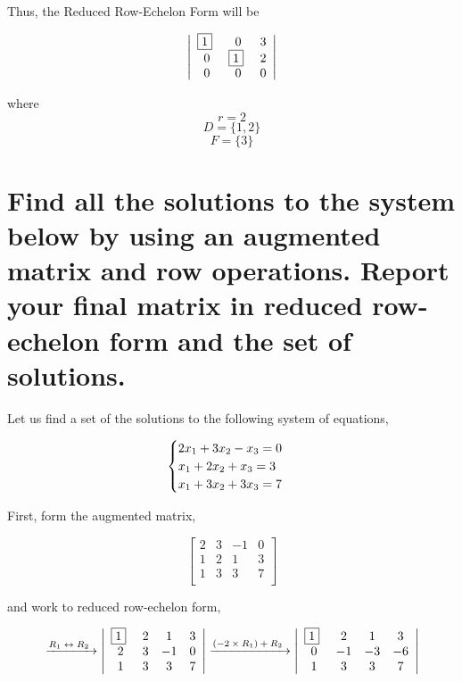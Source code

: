 \documentclass{article}
\begin{document}
\bigskip

Thus, the Reduced Row-Echelon Form will be

\[\left| \begin{array}{ccc}
$\boxed{1}$~ & 0 & 3  \\
0 & $\boxed{1}$~ & 2 \\
0 & 0 & 0
\end{array} \right|\]

where
\[r=2\]
\[D=\{1,2\}\]
\[F=\{3\}\]




\section{Find all the solutions to the system below by using an augmented matrix and row operations. Report your final matrix in reduced row-echelon form and the set of solutions.}

Let us find a set of the solutions to the following system of equations,

\[
\begin{cases}
2x\textsubscript{1} + 3x\textsubscript{2} - x\textsubscript{3} = 0 \\
x\textsubscript{1} + 2x\textsubscript{2} + x\textsubscript{3} = 3 \\
x\textsubscript{1} + 3x\textsubscript{2} + 3x\textsubscript{3} = 7
\end{cases}
\]

\bigskip

First, form the augmented matrix,

\[
\left[
\begin{array}{cccc}
2 & 3 & -1 & 0 \\
1 & 2 & 1 & 3 \\
1 & 3 & 3 & 7 \\
\end{array}
\right]
\]

\bigskip

and work to reduced row-echelon form,

\[
\xrightarrow[]{\text{$ R\textsubscript{1} \leftrightarrow R\textsubscript{2} $~}}
\left| \begin{array}{cccc}
$\boxed{1}$~ & 2 & 1 & 3 \\
2 & 3 & -1 & 0 \\
1 & 3 & 3 & 7 \\
\end{array} \right|
\xrightarrow[]{\text{$ (-2 \times R\textsubscript{1}) + R\textsubscript{2} $~}}
\left| \begin{array}{cccc}
$\boxed{1}$~ & 2 & 1 & 3 \\
0 & -1 & -3 & -6 \\
1 & 3 & 3 & 7 \\
\end{array} \right|
\]
\end{document}
